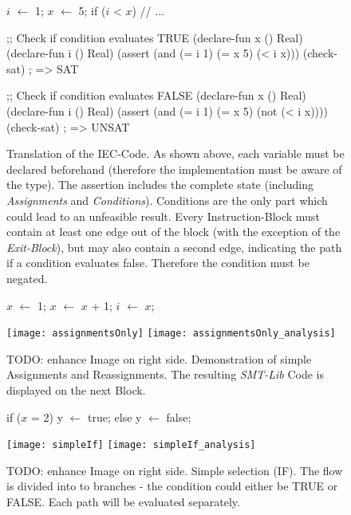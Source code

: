 \begin{figure}[h!]
	\begin{GenericCode}
		$i$ $\leftarrow$ 1;
		$x$ $\leftarrow$ 5;
		if ($i$ < $x$) {
			// ...
		}
	\end{GenericCode}
	\begin{GenericCode}
		;; Check if condition evaluates TRUE
		(declare-fun x () Real)
		(declare-fun i () Real)
		(assert (and (= i 1) (= x 5) (< i x)))
		(check-sat)
		; => SAT
	\end{GenericCode}
	\begin{GenericCode}
		;; Check if condition evaluates FALSE	
		(declare-fun x () Real)
		(declare-fun i () Real)
		(assert (and (= i 1) (= x 5) (not (< i x))))
		(check-sat)
		; => UNSAT
	\end{GenericCode}
	\caption{Translation of the IEC-Code. As shown above, each variable must be declared beforehand (therefore the implementation must be aware of the type). The assertion includes the complete state (including \emph{Assignments} and \emph{Conditions}). Conditions are the only part which could lead to an unfeasible result. Every Instruction-Block must contain at least one edge out of the block (with the exception of the \emph{Exit-Block}), but may also contain a second edge, indicating the path if a condition evaluates false. Therefore the condition must be negated.}
	\label{code:translation}
\end{figure}

\begin{figure}[!h]
	\begin{GenericCode}
		$x$ $\leftarrow$ 1;
		$x$ $\leftarrow$ $x$ + 1;
		$i$ $\leftarrow$ $x$;
	\end{GenericCode}
	\centering
	\texttt{[image: assignmentsOnly]}
	\texttt{[image: assignmentsOnly\_analysis]}
	\caption{TODO: enhance Image on right side. Demonstration of simple Assignments and Reassignments. The resulting \emph{SMT-Lib} Code is displayed on the next Block.}
	\label{fig:assignmentOnly}
\end{figure}

\begin{figure}[!h]
	\begin{GenericCode}
		if ($x$ = 2) 
			y $\leftarrow$ true;
		else
			y $\leftarrow$ false;
	\end{GenericCode}
	\centering
	\texttt{[image: simpleIf]}
	\texttt{[image: simpleIf\_analysis]}
	  \caption{TODO: enhance Image on right side. Simple selection (IF). The flow is divided into to branches - the condition could either be TRUE or FALSE. Each path will be evaluated separately. }
	\label{fig:simpleIf}	
\end{figure}

